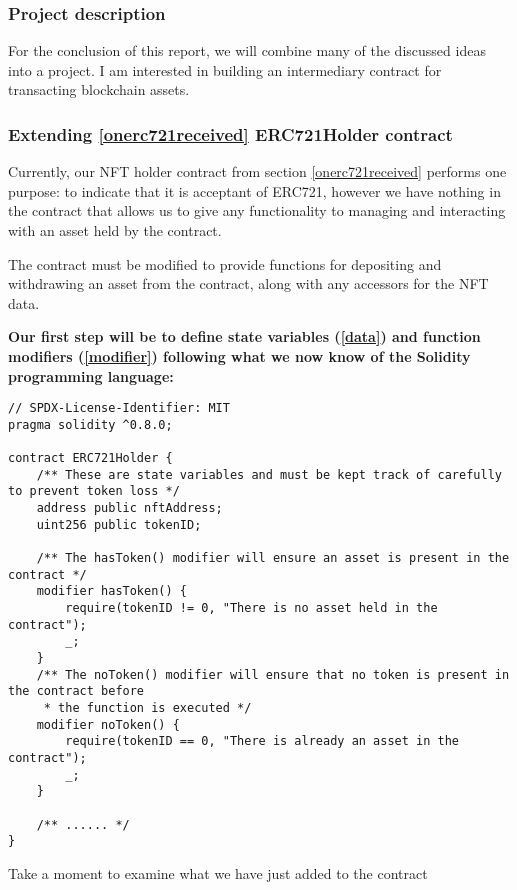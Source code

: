 \documentclass{article}
\theoremstyle{theorem}
\theoremstyle{definition}
\theoremstyle{remark}
\begin{document}
\subsubsection{Project description}
For the conclusion of this report, we will combine many of the discussed ideas into a project. I am interested in building an intermediary contract for transacting blockchain assets.


\subsubsection{Extending \ref{onerc721received} ERC721Holder contract} \label{erc721holder}

Currently, our NFT holder contract from section \ref{onerc721received} performs one purpose: to indicate that it is acceptant of ERC721, however we have nothing in the contract that allows us to give any functionality to managing and interacting with an asset held by the contract.

\medskip\noindent
The contract must be modified to provide functions for depositing and withdrawing an asset from the contract, along with any accessors for the NFT data.

\medskip\noindent
\begin{itemize}
\textbf{Our first step will be to define state variables (\ref{data}) and function modifiers (\ref{modifier}) following what we now know of the Solidity programming language:}

\begin{lstlisting}
// SPDX-License-Identifier: MIT
pragma solidity ^0.8.0;

contract ERC721Holder {
    /** These are state variables and must be kept track of carefully to prevent token loss */
    address public nftAddress;
    uint256 public tokenID;
    
    /** The hasToken() modifier will ensure an asset is present in the contract */
    modifier hasToken() {
        require(tokenID != 0, "There is no asset held in the contract");
        _;
    }
    /** The noToken() modifier will ensure that no token is present in the contract before 
     * the function is executed */
    modifier noToken() {
        require(tokenID == 0, "There is already an asset in the contract");
        _;
    }
    
    /** ...... */
}
\end{lstlisting}
\end{itemize}

\medskip\noindent
Take a moment to examine what we have just added to the contract
\end{document}
